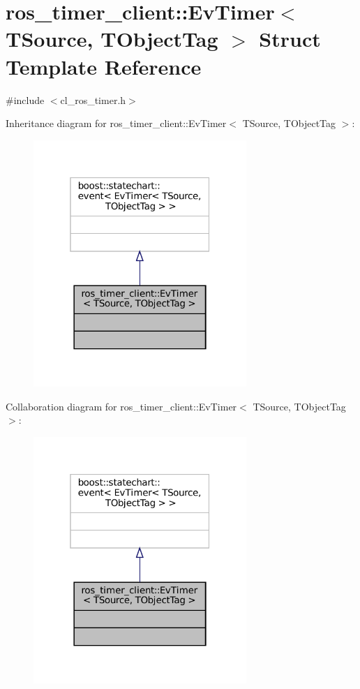 \hypertarget{structros__timer__client_1_1EvTimer}{}\section{ros\+\_\+timer\+\_\+client\+:\+:Ev\+Timer$<$ T\+Source, T\+Object\+Tag $>$ Struct Template Reference}
\label{structros__timer__client_1_1EvTimer}


{\ttfamily \#include $<$cl\+\_\+ros\+\_\+timer.\+h$>$}



Inheritance diagram for ros\+\_\+timer\+\_\+client\+:\+:Ev\+Timer$<$ T\+Source, T\+Object\+Tag $>$\+:
\nopagebreak
\begin{figure}[H]
\begin{center}
\leavevmode
\includegraphics[width=229pt]{structros__timer__client_1_1EvTimer__inherit__graph}
\end{center}
\end{figure}


Collaboration diagram for ros\+\_\+timer\+\_\+client\+:\+:Ev\+Timer$<$ T\+Source, T\+Object\+Tag $>$\+:
\nopagebreak
\begin{figure}[H]
\begin{center}
\leavevmode
\includegraphics[width=229pt]{structros__timer__client_1_1EvTimer__coll__graph}
\end{center}
\end{figure}


